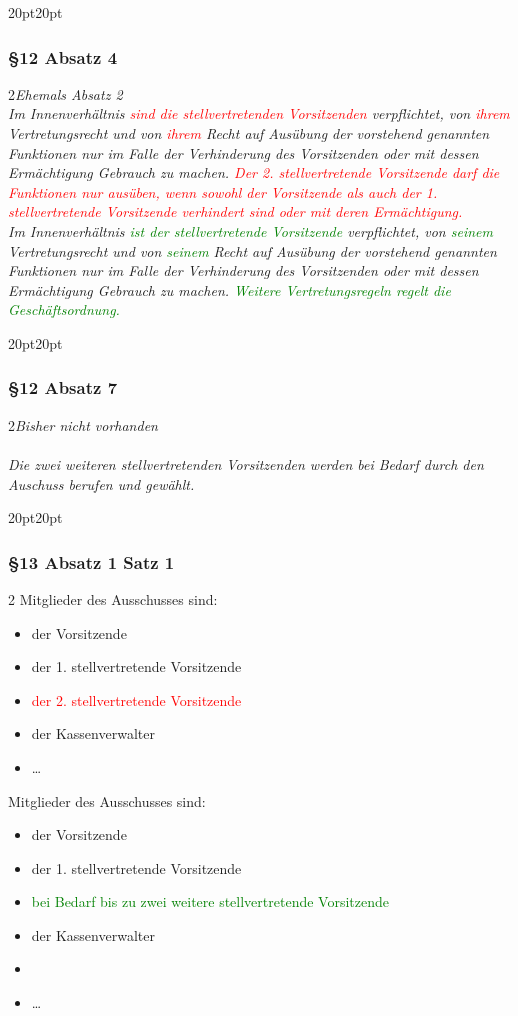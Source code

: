 \documentclass[10pt,a4paper,parskip=half]{scrartcl}
\newcommand{\new}[1]{\textcolor{Green}{#1}}
\newcommand{\old}[1]{\textcolor{Red}{#1}}
\newcommand{\change}[1]{
  \begin{adjustwidth}{20pt}{20pt}
    #1
  \end{adjustwidth}
}
\newcommand{\compare}[3]{\change{\subsubsection*{#1}\begin{multicols}{2}#2\columnbreak\\#3\end{multicols}}}
\begin{document}
  \compare{§12 Absatz 4}
  {\em Ehemals Absatz 2\em\\
  Im Innenverhältnis \old{sind die stellvertretenden Vorsitzenden} verpflichtet,
    von \old{ihrem} Vertretungsrecht und von \old{ihrem} Recht auf Ausübung der vorstehend genannten Funktionen nur im Falle der Verhinderung des Vorsitzenden oder mit dessen Ermächtigung Gebrauch zu machen.
    \old{Der 2. stellvertretende Vorsitzende darf die Funktionen nur ausüben,
    wenn sowohl der
    Vorsitzende als auch der 1. stellvertretende Vorsitzende verhindert sind oder mit deren Ermächtigung.}
  }
  {Im Innenverhältnis \new{ist der stellvertretende Vorsitzende} verpflichtet,
    von \new{seinem} Vertretungsrecht und von \new{seinem} Recht auf Ausübung der vorstehend genannten Funktionen nur im Falle der Verhinderung des Vorsitzenden oder mit dessen Ermächtigung Gebrauch zu machen. \new{Weitere Vertretungsregeln regelt die Geschäftsordnung.}}

  \compare{§12 Absatz 7}
  {\em Bisher nicht vorhanden\em\\}{
    Die zwei weiteren stellvertretenden Vorsitzenden werden bei Bedarf durch den Auschuss berufen und gewählt.
  }

  \change{
    \subsubsection*{§13 Absatz 1 Satz 1}
    \begin{multicols}{2}
    Mitglieder des Ausschusses sind:
      \begin{itemize}[noitemsep]
        \item der Vorsitzende
        \item der 1. stellvertretende Vorsitzende
        \item \old{der 2. stellvertretende Vorsitzende}
        \item der Kassenverwalter
        \item \dots
      \end{itemize}
    \columnbreak
    Mitglieder des Ausschusses sind:
      \begin{itemize}[noitemsep]
        \item der Vorsitzende
        \item der 1. stellvertretende Vorsitzende
        \item \new{bei Bedarf bis zu zwei weitere stellvertretende Vorsitzende}
        \item der Kassenverwalter
        \item \item \dots
      \end{itemize}
    \end{multicols}
    }
\end{document}
